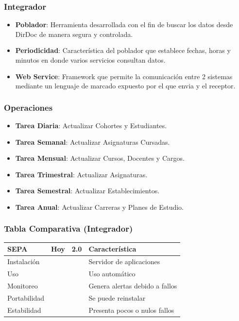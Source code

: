 \documentclass{beamer}
\newcommand{\cmark}{\ding{51}}%
\newcommand{\xmark}{\ding{55}}%
\begin{document}

\begin{frame}
\frametitle{Integrador}
\begin{itemize}
\item \textbf{Poblador}: Herramienta desarrollada con el fin de buscar los datos desde DirDoc de manera segura y controlada.
\item \textbf{Periodicidad}: Característica del poblador que establece fechas, horas y minutos en donde varios servicios consultan datos.
\item \textbf{Web Service}: Framework que permite la comunicación entre 2 sistemas mediante un lenguaje de marcado expuesto por el que envia y el receptor.
\end{itemize}
\end{frame}


\begin{frame}
\frametitle{Operaciones}
\begin{itemize}
\item \textbf{Tarea Diaria}: Actualizar Cohortes y Estudiantes.
\item \textbf{Tarea Semanal}: Actualizar Asignaturas Cursadas.
\item \textbf{Tarea Mensual}: Actualizar Cursos, Docentes y Cargos.
\item \textbf{Tarea Trimestral}: Actualizar Asignaturas.
\item \textbf{Tarea Semestral}: Actualizar Establecimientos.
\item \textbf{Tarea Anual}: Actualizar Carreras y Planes de Estudio.
\end{itemize}
\end{frame}


\begin{frame}
\frametitle{Tabla Comparativa (Integrador)}
\begin{table}
\begin{tabular}{l l l l}
\toprule
\textbf{SEPA} & \textbf{Hoy} & \textbf{2.0} & Característica\\
\midrule
Instalación 	& \textcolor{red}{\xmark}   & \textcolor{green}{\cmark} & Servidor de aplicaciones  \\
Uso		 		& \textcolor{green}{\cmark} & \textcolor{green}{\cmark} & Uso automático \\
Monitoreo 		& \textcolor{green}{\cmark} & \textcolor{green}{\cmark} & Genera alertas debido a fallos \\
Portabilidad 	& \textcolor{red}{\xmark}   & \textcolor{green}{\cmark} & Se puede reinstalar \\
Estabilidad 	& \textcolor{red}{\xmark}   & \textcolor{green}{\cmark} & Presenta pocos o nulos fallos \\
\bottomrule
\end{tabular}
\end{table}
\end{frame}
\end{document}
